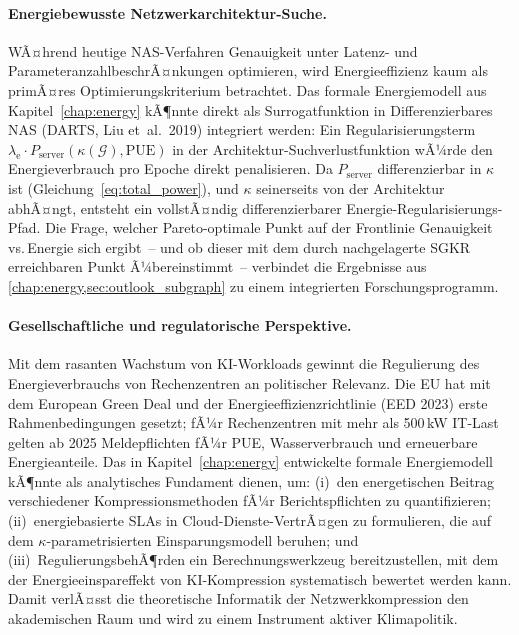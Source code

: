 ﻿\documentclass[12pt, a4paper, openany]{report}
\newcommand{\calG}{\mathcal{G}}
\begin{document}
\paragraph{Energiebewusste Netzwerkarchitektur-Suche.}
WÃ¤hrend heutige NAS-Verfahren Genauigkeit unter Latenz- und
ParameteranzahlbeschrÃ¤nkungen optimieren, wird Energieeffizienz kaum
als primÃ¤res Optimierungskriterium betrachtet.  Das formale Energiemodell
aus Kapitel~\ref{chap:energy} kÃ¶nnte direkt als Surrogatfunktion in
Differenzierbares NAS (DARTS, Liu et~al.\ 2019) integriert werden:
Ein Regularisierungsterm $\lambda_{\mathrm{e}} \cdot P_{\mathrm{server}}(\kappa(\calG), \mathrm{PUE})$
in der Architektur-Suchverlustfunktion wÃ¼rde den Energieverbrauch
pro Epoche direkt penalisieren.  Da $P_{\mathrm{server}}$ differenzierbar in
$\kappa$ ist (Gleichung~\eqref{eq:total_power}), und $\kappa$ seinerseits
von der Architektur abhÃ¤ngt, entsteht ein vollstÃ¤ndig differenzierbarer
Energie-Regularisierungs-Pfad.  Die Frage, welcher Pareto-optimale Punkt
auf der Frontlinie Genauigkeit\,vs.\,Energie sich ergibt~-- und ob dieser
mit dem durch nachgelagerte SGKR erreichbaren Punkt Ã¼bereinstimmt~--
verbindet die Ergebnisse aus \cref{chap:energy,sec:outlook_subgraph} zu
einem integrierten Forschungsprogramm.

\paragraph{Gesellschaftliche und regulatorische Perspektive.}
Mit dem rasanten Wachstum von KI-Workloads gewinnt die Regulierung des
Energieverbrauchs von Rechenzentren an politischer Relevanz.  Die EU hat
mit dem European Green Deal und der Energieeffizienzrichtlinie (EED 2023)
erste Rahmenbedingungen gesetzt; fÃ¼r Rechenzentren mit mehr als 500\,kW
IT-Last gelten ab 2025 Meldepflichten fÃ¼r PUE, Wasserverbrauch und
erneuerbare Energieanteile.  Das in Kapitel~\ref{chap:energy} entwickelte
formale Energiemodell kÃ¶nnte als analytisches Fundament dienen, um:
(i)~den energetischen Beitrag verschiedener Kompressionsmethoden fÃ¼r
Berichtspflichten zu quantifizieren; (ii)~energiebasierte SLAs in
Cloud-Dienste-VertrÃ¤gen zu formulieren, die auf dem
$\kappa$-parametrisierten Einsparungsmodell beruhen; und
(iii)~RegulierungsbehÃ¶rden ein Berechnungswerkzeug bereitzustellen, mit
dem der Energieeinspareffekt von KI-Kompression systematisch bewertet
werden kann.  Damit verlÃ¤sst die theoretische Informatik der
Netzwerkkompression den akademischen Raum und wird zu einem Instrument
aktiver Klimapolitik.
\end{document}
